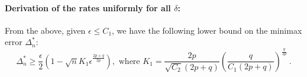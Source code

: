 % 
% 
% 

\paragraph{Derivation of the rates uniformly for all $\delta$:}
From the above, given $\epsilon \le C_1$, we have the following lower bound on the minimax error $\Delta_n^{*}$:
\[
\Delta_n^* \ge \frac{\epsilon}{2}\left(1-\sqrt{n} K_1 \epsilon^{\frac{2p+q}{2p}}\right),
\text{ where } K_1= \frac{2p}{\sqrt{C_2}(2p+q)}\left(\frac{q}{C_1(2p+q)}\right)^{\frac{q}{2p}}~.
\]
 
